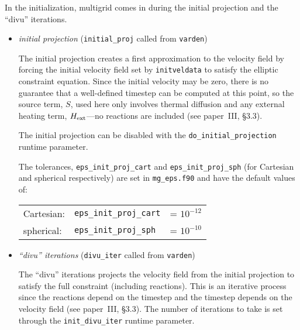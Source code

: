 In the initialization, multigrid comes in during the initial projection
and the ``divu'' iterations.

\begin{itemize}

\item {\em initial projection} ({\tt initial\_proj} called from {\tt varden})

  The initial projection creates a first approximation to the velocity
  field by forcing the initial velocity field set by {\tt initveldata}
  to satisfy the elliptic constraint equation.  Since the initial
  velocity may be zero, there is no guarantee that a well-defined
  timestep can be computed at this point, so the source term, $S$,
  used here only involves thermal diffusion and any external heating
  term, ${H_{\rm ext}}$---no reactions are included (see paper~III, \S 3.3).

  The initial projection can be disabled with the {\tt do\_initial\_projection}
  runtime parameter.

  The tolerances, {\tt eps\_init\_proj\_cart} and {\tt eps\_init\_proj\_sph}
  (for Cartesian and spherical respectively) are set in {\tt mg\_eps.f90}
  and have the default values of:
   \begin{center}
   \begin{tabular}{lll}
   Cartesian:   &  {\tt eps\_init\_proj\_cart} &= $10^{-12}$ \\
   spherical:   &  {\tt eps\_init\_proj\_sph}  &= $10^{-10}$
   \end{tabular}
   \end{center}


\item {\em ``divu'' iterations} ({\tt divu\_iter} called from {\tt varden})

  The ``divu'' iterations projects the velocity field from the initial
  projection to satisfy the full constraint (including reactions).
  This is an iterative process since the reactions depend on the
  timestep and the timestep depends on the velocity field (see
  paper~III, \S 3.3).  The number of iterations to take is set through
  the {\tt init\_divu\_iter} runtime parameter.


\end{itemize}
